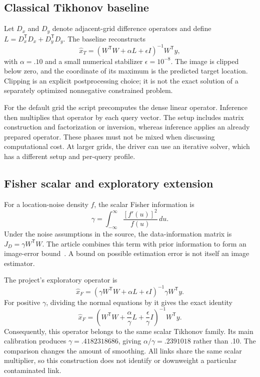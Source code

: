 \documentclass[conference,letterpaper]{IEEEtran}
\newcommand{\T}{^{\mathsf T}}
\begin{document}
\subsection{Classical Tikhonov baseline}
Let $D_x$ and $D_y$ denote adjacent-grid difference operators and define $L=D_x\T D_x+D_y\T D_y$. The baseline reconstructs
\begin{equation}
\widehat x_T=(W\T W+\alpha L+\epsilon I)^{-1}W\T y,
\label{eq:tikhonov}
\end{equation}
with $\alpha=.10$ and a small numerical stabilizer $\epsilon=10^{-8}$. The image is clipped below zero, and the coordinate of its maximum is the predicted target location. Clipping is an explicit postprocessing choice; it is not the exact solution of a separately optimized nonnegative constrained problem.

For the default grid the script precomputes the dense linear operator. Inference then multiplies that operator by each query vector. The setup includes matrix construction and factorization or inversion, whereas inference applies an already prepared operator. These phases must not be mixed when discussing computational cost. At larger grids, the driver can use an iterative solver, which has a different setup and per-query profile.

\subsection{Fisher scalar and exploratory extension}
For a location-noise density $f$, the scalar Fisher information is
\begin{equation}
\gamma=\int_{-\infty}^{\infty}\frac{[f'(u)]^2}{f(u)}\,du.
\label{eq:gamma}
\end{equation}
Under the noise assumptions in the source, the data-information matrix is $J_D=\gamma W\T W$. The article combines this term with prior information to form an image-error bound~\cite{wilson2010}. A bound on possible estimation error is not itself an image estimator.

The project's exploratory operator is
\begin{equation}
\widehat x_F=(\gamma W\T W+\alpha L+\epsilon I)^{-1}\gamma W\T y.
\label{eq:fisheroperator}
\end{equation}
For positive $\gamma$, dividing the normal equations by it gives the exact identity
\begin{equation}
\widehat x_F=\left(W\T W+\frac{\alpha}{\gamma}L+
\frac{\epsilon}{\gamma}I\right)^{-1}W\T y.
\label{eq:equivalence}
\end{equation}
Consequently, this operator belongs to the same scalar Tikhonov family. Its main calibration produces $\gamma=.4182318686$, giving $\alpha/\gamma=.2391018$ rather than .10. The comparison changes the amount of smoothing. All links share the same scalar multiplier, so this construction does not identify or downweight a particular contaminated link.
\end{document}
